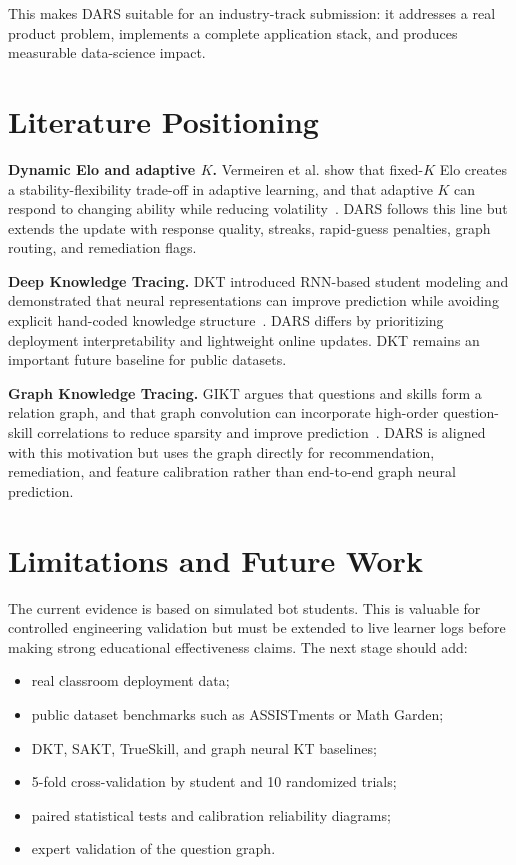 \documentclass[sigconf,nonacm]{acmart}
\begin{document}
This makes DARS suitable for an industry-track submission: it addresses a real product problem, implements a complete application stack, and produces measurable data-science impact.

\section{Literature Positioning}
\textbf{Dynamic Elo and adaptive $K$.} Vermeiren et al. show that fixed-$K$ Elo creates a stability-flexibility trade-off in adaptive learning, and that adaptive $K$ can respond to changing ability while reducing volatility~\cite{vermeiren2025dynamic}. DARS follows this line but extends the update with response quality, streaks, rapid-guess penalties, graph routing, and remediation flags.

\textbf{Deep Knowledge Tracing.} DKT introduced RNN-based student modeling and demonstrated that neural representations can improve prediction while avoiding explicit hand-coded knowledge structure~\cite{piech2015dkt}. DARS differs by prioritizing deployment interpretability and lightweight online updates. DKT remains an important future baseline for public datasets.

\textbf{Graph Knowledge Tracing.} GIKT argues that questions and skills form a relation graph, and that graph convolution can incorporate high-order question-skill correlations to reduce sparsity and improve prediction~\cite{yang2020gikt}. DARS is aligned with this motivation but uses the graph directly for recommendation, remediation, and feature calibration rather than end-to-end graph neural prediction.

\section{Limitations and Future Work}
The current evidence is based on simulated bot students. This is valuable for controlled engineering validation but must be extended to live learner logs before making strong educational effectiveness claims. The next stage should add:

\begin{itemize}[leftmargin=*]
  \item real classroom deployment data;
  \item public dataset benchmarks such as ASSISTments or Math Garden;
  \item DKT, SAKT, TrueSkill, and graph neural KT baselines;
  \item 5-fold cross-validation by student and 10 randomized trials;
  \item paired statistical tests and calibration reliability diagrams;
  \item expert validation of the question graph.
\end{itemize}
\end{document}
